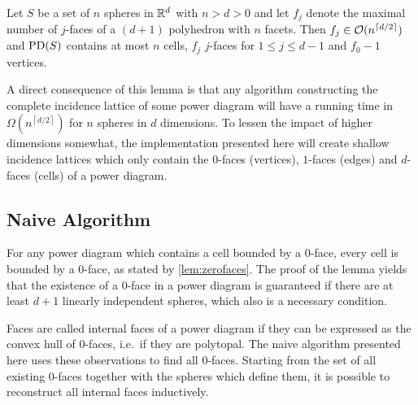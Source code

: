 \begin{lemma}
    \label{lem:latticesexponential}
    Let $S$ be a set of $n$ spheres in $\mathbb{R}^d$ with $n > d > 0$ and let $f_j$ denote the maximal number of $j$-faces of a $(d + 1)$ polyhedron with $n$ facets. Then $f_j \in \mathcal{O}(n^{\left\lceil d/2 \right\rceil})$ and $\operatorname{PD}(S)$ contains at most $n$ cells, $f_j$ $j$-faces for $1 \leq j \leq d-1$ and $f_0 - 1$ vertices.
\end{lemma}

A direct consequence of this lemma is that any algorithm constructing the complete incidence lattice of some power diagram will have a running time in $\Omega(n^{\left\lceil d/2 \right\rceil})$ for $n$ spheres in $d$ dimensions.
To lessen the impact of higher dimensions somewhat, the implementation presented here will create shallow incidence lattices which only contain the $0$-faces (vertices), $1$-faces (edges) and $d$-faces (cells) of a power diagram.

\subsection{Naive Algorithm}
\label{sub:naive_algorithm}
For any power diagram which contains a cell bounded by a $0$-face, every cell is bounded by a $0$-face, as stated by \cref{lem:zerofaces}.
The proof of the lemma yields that the existence of a $0$-face in a power diagram is guaranteed if there are at least $d+1$ linearly independent spheres, which also is a necessary condition.

Faces are called internal faces of a power diagram if they can be expressed as the convex hull of $0$-faces, i.e.~if they are polytopal.
The naive algorithm presented here uses these observations to find all $0$-faces.
Starting from the set of all existing $0$-faces together with the spheres which define them, it is possible to reconstruct all internal faces inductively.

